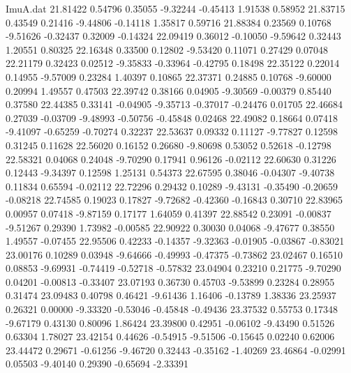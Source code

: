 \begin{filecontents}{ImuA.dat}
  21.81422    0.54796    0.35055   -9.32244   -0.45413    1.91538    0.58952
  21.83715    0.43549    0.21416   -9.44806   -0.14118    1.35817    0.59716
  21.88384    0.23569    0.10768   -9.51626   -0.32437    0.32009   -0.14324
  22.09419    0.36012   -0.10050   -9.59642    0.32443    1.20551    0.80325
  22.16348    0.33500    0.12802   -9.53420    0.11071    0.27429    0.07048
  22.21179    0.32423    0.02512   -9.35833   -0.33964   -0.42795    0.18498
  22.35122    0.22014    0.14955   -9.57009    0.23284    1.40397    0.10865
  22.37371    0.24885    0.10768   -9.60000    0.20994    1.49557    0.47503
  22.39742    0.38166    0.04905   -9.30569   -0.00379    0.85440    0.37580
  22.44385    0.33141   -0.04905   -9.35713   -0.37017   -0.24476    0.01705
  22.46684    0.27039   -0.03709   -9.48993   -0.50756   -0.45848    0.02468
  22.49082    0.18664    0.07418   -9.41097   -0.65259   -0.70274    0.32237
  22.53637    0.09332    0.11127   -9.77827    0.12598    0.31245    0.11628
  22.56020    0.16152    0.26680   -9.80698    0.53052    0.52618   -0.12798
  22.58321    0.04068    0.24048   -9.70290    0.17941    0.96126   -0.02112
  22.60630    0.31226    0.12443   -9.34397    0.12598    1.25131    0.54373
  22.67595    0.38046   -0.04307   -9.40738    0.11834    0.65594   -0.02112
  22.72296    0.29432    0.10289   -9.43131   -0.35490   -0.20659   -0.08218
  22.74585    0.19023    0.17827   -9.72682   -0.42360   -0.16843    0.30710
  22.83965    0.00957    0.07418   -9.87159    0.17177    1.64059    0.41397
  22.88542    0.23091   -0.00837   -9.51267    0.29390    1.73982   -0.00585
  22.90922    0.30030    0.04068   -9.47677    0.38550    1.49557   -0.07455
  22.95506    0.42233   -0.14357   -9.32363   -0.01905   -0.03867   -0.83021
  23.00176    0.10289    0.03948   -9.64666   -0.49993   -0.47375   -0.73862
  23.02467    0.16510    0.08853   -9.69931   -0.74419   -0.52718   -0.57832
  23.04904    0.23210    0.21775   -9.70290    0.04201   -0.00813   -0.33407
  23.07193    0.36730    0.45703   -9.53899    0.23284    0.28955    0.31474
  23.09483    0.40798    0.46421   -9.61436    1.16406   -0.13789    1.38336
  23.25937    0.26321    0.00000   -9.33320   -0.53046   -0.45848   -0.49436
  23.37532    0.55753    0.17348   -9.67179    0.43130    0.80096    1.86424
  23.39800    0.42951   -0.06102   -9.43490    0.51526    0.63304    1.78027
  23.42154    0.44626   -0.54915   -9.51506   -0.15645    0.02240    0.62006
  23.44472    0.29671   -0.61256   -9.46720    0.32443   -0.35162   -1.40269
  23.46864   -0.02991    0.05503   -9.40140    0.29390   -0.65694   -2.33391

\end{filecontents}
